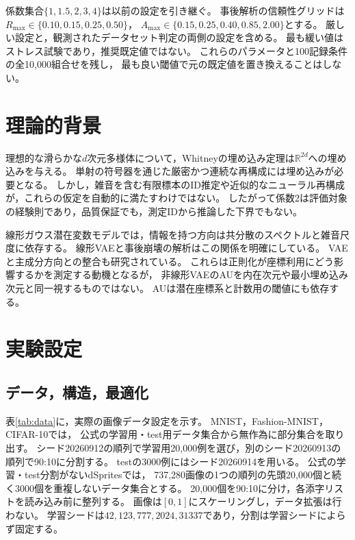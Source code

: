 \documentclass[11pt,a4paper]{ltjsarticle}
\begin{document}
係数集合$\{1,1.5,2,3,4\}$は以前の設定を引き継ぐ。
事後解析の信頼性グリッドは$R_{\max}\in\{0.10,0.15,0.25,0.50\}$，
$A_{\max}\in\{0.15,0.25,0.40,0.85,2.00\}$とする。
厳しい設定と，観測されたデータセット判定の両側の設定を含める。
最も緩い値はストレス試験であり，推奨既定値ではない。
これらのパラメータと100記録条件の全10,000組合せを残し，
最も良い閾値で元の既定値を置き換えることはしない。

\section{理論的背景}\label{sec:theory}
理想的な滑らかな$d$次元多様体について，Whitneyの埋め込み定理は$\mathbb R^{2d}$への埋め込みを与える\cite{whitney1944}。
単射の符号器を通じた厳密かつ連続な再構成には埋め込みが必要となる。
しかし，雑音を含む有限標本のID推定や近似的なニューラル再構成が，これらの仮定を自動的に満たすわけではない。
したがって係数2は評価対象の経験則であり，品質保証でも，測定IDから推論した下界でもない。

線形ガウス潜在変数モデルでは，情報を持つ方向は共分散のスペクトルと雑音尺度に依存する。
線形VAEと事後崩壊の解析はこの関係を明確にしている\cite{tippingbishop1999ppca,lucas2019elbo}。
VAEと主成分方向との整合も研究されている\cite{rolinek2019pca}。
これらは正則化が座標利用にどう影響するかを測定する動機となるが，
非線形VAEのAUを内在次元や最小埋め込み次元と同一視するものではない。
AUは潜在座標系と計数用の閾値にも依存する。

\section{実験設定}\label{sec:setup}

\subsection{データ，構造，最適化}
表\ref{tab:data}に，実際の画像データ設定を示す。
MNIST\cite{lecun1998}，Fashion-MNIST\cite{xiao2017fashion}，CIFAR-10\cite{krizhevsky2009learning}では，
公式の学習用・test用データ集合から無作為に部分集合を取り出す。
シード20260912の順列で学習用20,000例を選び，別のシード20260913の順列で90:10に分割する。
testの3000例にはシード20260914を用いる。
公式の学習・test分割がないdSprites\cite{matthey2017dsprites}では，
737,280画像の1つの順列の先頭20,000個と続く3000個を重複しないデータ集合とする。
20,000個を90:10に分け，各添字リストを読み込み前に整列する。
画像は$[0,1]$にスケーリングし，データ拡張は行わない。
学習シードは$42,123,777,2024,31337$であり，分割は学習シードによらず固定する。
\end{document}

